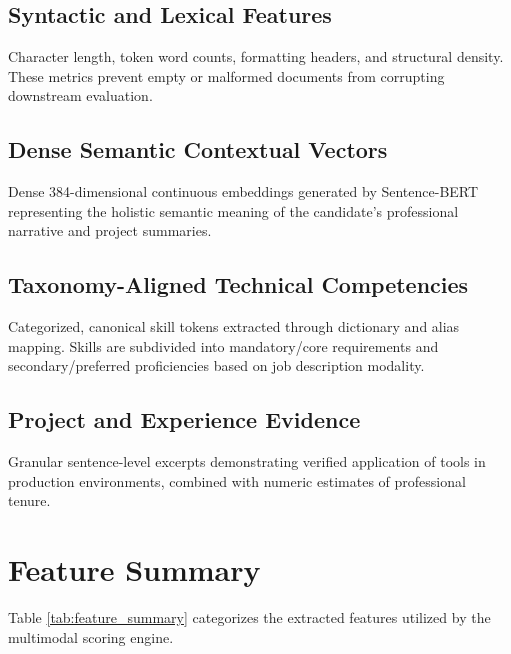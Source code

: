 \documentclass[12pt,a4paper]{report}
\begin{document}
\subsection{Syntactic and Lexical Features}
Character length, token word counts, formatting headers, and structural density. These metrics prevent empty or malformed documents from corrupting downstream evaluation.

\subsection{Dense Semantic Contextual Vectors}
Dense 384-dimensional continuous embeddings generated by Sentence-BERT representing the holistic semantic meaning of the candidate's professional narrative and project summaries.

\subsection{Taxonomy-Aligned Technical Competencies}
Categorized, canonical skill tokens extracted through dictionary and alias mapping. Skills are subdivided into mandatory/core requirements and secondary/preferred proficiencies based on job description modality.

\subsection{Project and Experience Evidence}
Granular sentence-level excerpts demonstrating verified application of tools in production environments, combined with numeric estimates of professional tenure.

\section{Feature Summary}
Table \ref{tab:feature_summary} categorizes the extracted features utilized by the multimodal scoring engine.
\end{document}
